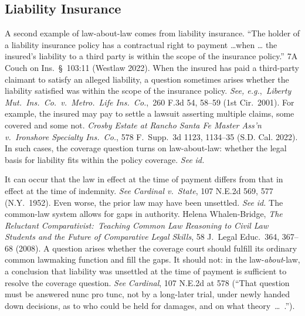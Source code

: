 \documentclass[
  12pt,
  letterpaper,
]{scrartcl}
\begin{document}
\subsection{Liability Insurance}

A second example of law-about-law comes from liability insurance. ``The holder
of a liability insurance policy has a contractual right to payment \ldots when \ldots
the insured's liability to a third party is within the scope of the insurance
policy.'' 7A Couch on Ins.~§~103:11 (Westlaw 2022). When the insured has paid a
third-party claimant to satisfy an alleged liability, a question sometimes
arises whether the liability satisfied was within the scope of the insurance
policy. \textit{See, e.g.},~\textit{Liberty Mut.~Ins.~Co.~v.~Metro.~Life
Ins.~Co.},~260 F.3d 54, 58--59 (1st Cir.~2001). For example, the insured may
pay to settle a lawsuit asserting multiple claims, some covered and some not.
\textit{Crosby Estate at Rancho Santa Fe Master Ass'n v.~Ironshore Specialty
Ins.~Co.}, 578 F.~Supp.~3d 1123, 1134--35 (S.D. Cal. 2022). In such cases, the
coverage question turns on law-about-law: whether the legal basis for liability
fits within the policy coverage. \textit{See} \textit{id.}

It can occur that the law in effect at the time of payment differs from that in
effect at the time of indemnity. \textit{See} \textit{Cardinal v.~State}, 107
N.E.2d 569, 577 (N.Y.~1952). Even worse, the prior law may have been unsettled.
\textit{See} \textit{id.} The common-law system allows for gaps in authority.
Helena Whalen-Bridge, \textit{The Reluctant Comparativist:~Teaching Common Law
Reasoning to Civil Law Students and the Future of Comparative Legal Skills}, 58
J.~Legal Educ.~364, 367--68 (2008). A question arises whether the coverage
court should fulfill its ordinary common lawmaking function and fill the gaps.
It should not: in the law-\textit{about}-law, a conclusion that liability was unsettled
at the time of payment is sufficient to resolve the coverage question. \textit{See}
\textit{Cardinal}, 107 N.E.2d at 578 (``That question must be answered nunc pro
tunc, not by a long-later trial, under newly handed down decisions, as to who
could be held for damages, and on what theory~\ldots~.'').
\end{document}
